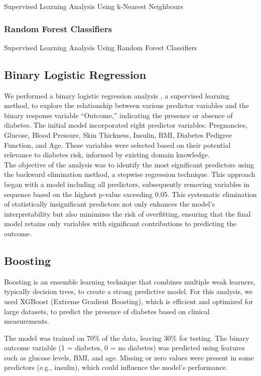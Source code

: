 \documentclass[12pt]{article}
\begin{document}
 Supervised Learning Analysis Using k-Nearest Neighbours

 \subsubsection{Random Forest Classifiers}
 
 Supervised Learning Analysis Using Random Forest Classifiers 

\subsection{Binary Logistic Regression}
We performed a binary logistic regression analysis \cite{faraway2016extending}, a supervised learning method, to explore the relationship between various predictor variables and the binary response variable “Outcome,” indicating the presence or absence of diabetes. The initial model incorporated eight predictor variables: Pregnancies, Glucose, Blood Pressure, Skin Thickness, Insulin, BMI, Diabetes Pedigree Function, and Age. These variables were selected based on their potential relevance to diabetes risk, informed by existing domain knowledge.\\
\setlength{\parindent}{0pt}
The objective of the analysis was to identify the most significant predictors using the backward elimination method, a stepwise regression technique. This approach began with a model including all predictors, subsequently removing variables in sequence based on the highest p-value exceeding 0.05. This systematic elimination of statistically insignificant predictors not only enhances the model’s interpretability but also minimizes the risk of overfitting, ensuring that the final model retains only variables with significant contributions to predicting the outcome.

\subsection{Boosting}

Boosting \cite{chen2015xgboost} \cite{friedman2001greedy} is an ensemble learning technique that combines multiple weak learners, typically decision trees, to create a strong predictive model. For this analysis, we used XGBoost (Extreme Gradient Boosting), which is efficient and optimized for large datasets, to predict the presence of diabetes based on clinical measurements.

The model was trained on 70\% of the data, leaving 30\% for testing. The binary outcome variable (1 = diabetes, 0 = no diabetes) was predicted using features such as glucose levels, BMI, and age. Missing or zero values were present in some predictors (e.g., insulin), which could influence the model's performance.
\end{document}
